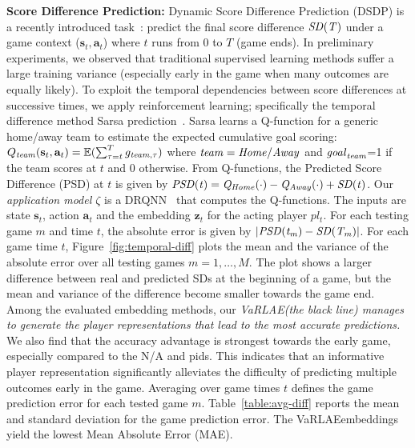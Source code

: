 \documentclass{article}
\newcommand{\expect}{\mathbb{E}}
\newcommand{\scorediff}{\it{SD}}
\newcommand{\latentvariables}{\mathbf{z}}
\newcommand{\state}{\mathbf{s}}
\newcommand{\action}{\mathbf{a}}
\newcommand{\goal}{g}
\newcommand{\player}{pl}
\newcommand{\home}{\it{Home}}
\newcommand{\away}{\it{Away}}
\newcommand{\team}{\it{team}}
\newcommand{\egoal}{\it{goal}}
\newcommand{\system}{VaRLAE\;}
\begin{document}
{\bf Score Difference Prediction:}\label{subsec:score-diff}
Dynamic Score Difference Prediction (DSDP) is a recently introduced task~\cite{ganguly2018problem}: 
predict the final score difference $\scorediff(T)$ under a game context ($\state_{t},\action_{t}$) where $t$ runs from 0 to $T$ (game ends). 
In preliminary experiments, we observed that traditional supervised learning methods suffer a large training variance (especially early in the game when many outcomes are equally likely).
To exploit the temporal dependencies between score differences at successive times, we apply reinforcement learning; specifically the temporal difference method Sarsa prediction~\cite{sutton2018reinforcement}. Sarsa learns a Q-function for a generic home/away team to estimate the expected cumulative goal scoring: $Q_{\team}(\state_{t},\action_{t})= \expect(\sum_{\tau=t}^{T}\goal_{\team,\tau})$ where $\team=\home/\away$ and $\egoal_{\team}$=1 if the team scores at $t$ and 0 otherwise. From Q-functions, the Predicted Score Difference (PSD) at $t$ is given by %
$\it{PSD}(t)= Q_{\home}(\cdot)-Q_{\away}(\cdot) + \scorediff(t)$.
Our {\em application model $\zeta$} is a DRQNN~\cite{littlestone} that computes the Q-functions. The inputs are state $\state_{t}$, action $\action_{t}$ and the embedding $\latentvariables_{t}$ for the acting player $\player_{t}$. 
For each testing game $m$ and time $t$, the absolute error is given by  $ |\it{PSD}(t_m)-\scorediff(T_m)|$. 
For each game time $t$, Figure~\ref{fig:temporal-diff} plots the mean and the variance of the absolute error over all testing games $m=1,\ldots,M$. 
The plot shows a larger difference between real and predicted SDs at the beginning of a game, but the mean and variance of the difference become smaller towards the game end. Among the evaluated embedding methods, our {\em \system (the black line) manages to generate the player representations that lead to the most accurate predictions.} We also find that the accuracy advantage is strongest towards the early game, especially compared to the N/A and pids. This indicates that an informative player representation significantly alleviates the difficulty of predicting multiple outcomes early in the  game. 
Averaging over game times $t$ defines the game prediction error for each tested game $m$. Table~\ref{table:avg-diff} reports the mean and standard deviation for the game prediction error.
The \system embeddings yield the lowest Mean Absolute Error (MAE).
\end{document}
